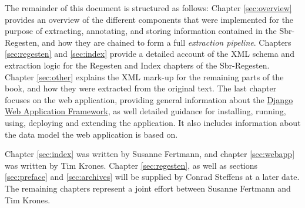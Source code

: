 The remainder of this document is structured as follows: Chapter
\ref{sec:overview} provides an overview of the different components
that were implemented for the purpose of extracting, annotating, and
storing information contained in the Sbr-Regesten, and how they are
chained to form a full \emph{extraction pipeline}. Chapters
\ref{sec:regesten} and \ref{sec:index} provide a detailed account of
the XML schema and extraction logic for the Regesten and Index
chapters of the Sbr-Regesten. Chapter \ref{sec:other} explains the XML
mark-up for the remaining parts of the book, and how they were
extracted from the original text. The last chapter focuses on the web
application, providing general information about the
\href{https://www.djangoproject.com/}{Django Web Application
  Framework}, as well detailed guidance for installing, running,
using, deploying and extending the application. It also includes
information about the data model the web application is based on.

Chapter \ref{sec:index} was written by Susanne Fertmann, and chapter
\ref{sec:webapp} was written by Tim Krones. Chapter
\ref{sec:regesten}, as well as sections \ref{sec:preface} and
\ref{sec:archives} will be supplied by Conrad Steffens at a later
date. The remaining chapters represent a joint effort between Susanne
Fertmann and Tim Krones.
